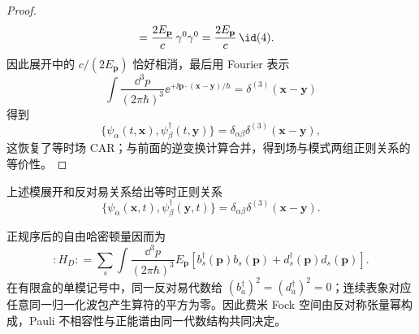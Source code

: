 \begin{proof}
\begin{align*}
&=\frac{2E_{\mathbf p}}{c}\,\gamma^0\gamma^0
=\frac{2E_{\mathbf p}}{c}\,\id(4).
\end{align*}
因此展开中的 $c/(2E_{\mathbf p})$ 恰好相消，最后用 Fourier 表示
\begin{equation*}
\int\frac{\dd^3 p}{(2\pi\hbar)^3}\ee^{+\ii\mathbf p\cdot(\mathbf x-\mathbf y)/\hbar}
=\delta^{(3)}(\mathbf x-\mathbf y)
\end{equation*}
得到
\begin{equation*}
\{\psi_\alpha(t,\mathbf x),\psi_\beta^\dagger(t,\mathbf y)\}
=\delta_{\alpha\beta}\delta^{(3)}(\mathbf x-\mathbf y),
\end{equation*}
这恢复了等时场 CAR；与前面的逆变换计算合并，得到场与模式两组正则关系的等价性。
\end{proof}


\begin{proposition}[正则归一化与正能粒子谱]
上述模展开和反对易关系给出等时正则关系
\begin{equation*}
\{\psi_\alpha(\mathbf x,t),\psi_\beta^\dagger(\mathbf y,t)\}
=\delta_{\alpha\beta}\delta^{(3)}(\mathbf x-\mathbf y).
\end{equation*}

正规序后的自由哈密顿量因而为
\begin{equation}
\boxed{
:\!H_D\!:
=\sum_s\int\frac{\dd^3 p}{(2\pi\hbar)^3}E_{\mathbf p}
\left[b_s^\dagger(\mathbf p)b_s(\mathbf p)
+d_s^\dagger(\mathbf p)d_s(\mathbf p)\right].}
\label{eq:dirac-H-positive-r2}
\end{equation}
在有限盒的单模记号中，同一反对易代数给 $(b_a^\dagger)^2=(d_a^\dagger)^2=0$；连续表象对应任意同一归一化波包产生算符的平方为零。因此费米 Fock 空间由反对称张量幂构成，Pauli 不相容性与正能谱由同一代数结构共同决定。
\end{proposition}

